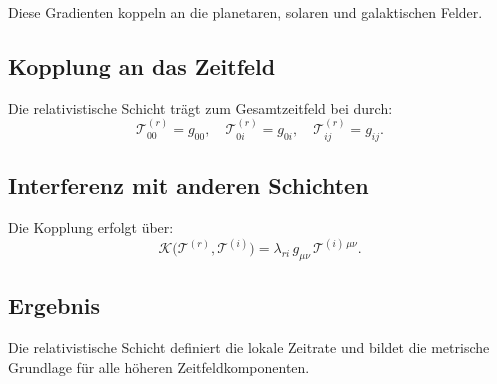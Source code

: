 Diese Gradienten koppeln an die planetaren, solaren und galaktischen Felder.

\subsection{Kopplung an das Zeitfeld}

Die relativistische Schicht trägt zum Gesamtzeitfeld bei durch:
\[
\mathcal{T}^{(r)}_{00} = g_{00},
\quad
\mathcal{T}^{(r)}_{0i} = g_{0i},
\quad
\mathcal{T}^{(r)}_{ij} = g_{ij}.
\]

\subsection{Interferenz mit anderen Schichten}

Die Kopplung erfolgt über:
\[
\mathcal{K}\big(\mathcal{T}^{(r)}, \mathcal{T}^{(i)}\big)
= \lambda_{ri} \, g_{\mu\nu} \, \mathcal{T}^{(i)\,\mu\nu}.
\]

\subsection{Ergebnis}

Die relativistische Schicht definiert die lokale Zeitrate und bildet die
metrische Grundlage für alle höheren Zeitfeldkomponenten.
